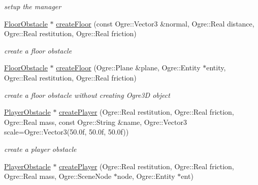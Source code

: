 \begin{DoxyCompactItemize}
\begin{DoxyCompactList}\small\item\em setup the manager \end{DoxyCompactList}\item 
\hyperlink{class_n_c_t_u_1_1_floor_obstacle}{Floor\+Obstacle} $\ast$ \hyperlink{class_n_c_t_u_1_1_obstacle_manager_a01a256af4e1c2daf7393a0efef7762d7}{create\+Floor} (const Ogre\+::\+Vector3 \&normal, Ogre\+::\+Real distance, Ogre\+::\+Real restitution, Ogre\+::\+Real friction)\hypertarget{class_n_c_t_u_1_1_obstacle_manager_a01a256af4e1c2daf7393a0efef7762d7}{}\label{class_n_c_t_u_1_1_obstacle_manager_a01a256af4e1c2daf7393a0efef7762d7}

\begin{DoxyCompactList}\small\item\em create a floor obstacle \end{DoxyCompactList}\item 
\hyperlink{class_n_c_t_u_1_1_floor_obstacle}{Floor\+Obstacle} $\ast$ \hyperlink{class_n_c_t_u_1_1_obstacle_manager_a8ade0023637931e443eea3f5ff173ca9}{create\+Floor} (Ogre\+::\+Plane \&plane, Ogre\+::\+Entity $\ast$entity, Ogre\+::\+Real restitution, Ogre\+::\+Real friction)\hypertarget{class_n_c_t_u_1_1_obstacle_manager_a8ade0023637931e443eea3f5ff173ca9}{}\label{class_n_c_t_u_1_1_obstacle_manager_a8ade0023637931e443eea3f5ff173ca9}

\begin{DoxyCompactList}\small\item\em create a floor obstacle without creating Ogre3D object \end{DoxyCompactList}\item 
\hyperlink{class_n_c_t_u_1_1_player_obstacle}{Player\+Obstacle} $\ast$ \hyperlink{class_n_c_t_u_1_1_obstacle_manager_a684daad777b334deb7fee8e4ac81690b}{create\+Player} (Ogre\+::\+Real restitution, Ogre\+::\+Real friction, Ogre\+::\+Real mass, const Ogre\+::\+String \&name, Ogre\+::\+Vector3 scale=Ogre\+::\+Vector3(50.\+0f, 50.\+0f, 50.\+0f))\hypertarget{class_n_c_t_u_1_1_obstacle_manager_a684daad777b334deb7fee8e4ac81690b}{}\label{class_n_c_t_u_1_1_obstacle_manager_a684daad777b334deb7fee8e4ac81690b}

\begin{DoxyCompactList}\small\item\em create a player obstacle \end{DoxyCompactList}\item 
\hyperlink{class_n_c_t_u_1_1_player_obstacle}{Player\+Obstacle} $\ast$ \hyperlink{class_n_c_t_u_1_1_obstacle_manager_a442ee26a82c9d990a6c1325f56b8ab66}{create\+Player} (Ogre\+::\+Real restitution, Ogre\+::\+Real friction, Ogre\+::\+Real mass, Ogre\+::\+Scene\+Node $\ast$node, Ogre\+::\+Entity $\ast$ent)\hypertarget{class_n_c_t_u_1_1_obstacle_manager_a442ee26a82c9d990a6c1325f56b8ab66}{}\label{class_n_c_t_u_1_1_obstacle_manager_a442ee26a82c9d990a6c1325f56b8ab66}


\end{DoxyCompactItemize}
